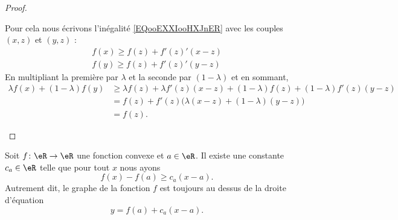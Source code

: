 \begin{proof}
\begin{subproof}
\begin{equation}
            \end{equation}
            Pour cela nous écrivons l'inégalité \eqref{EQooEXXIooHXJnER} avec les couples \( (x,z)\) et \( (y,z)\) :
            \begin{subequations}
                \begin{align}
                    f(x)\geq f(z)+f'(z)'(x-z)\\
                    f(y)\geq f(z)+f'(z)'(y-z)
                \end{align}
            \end{subequations}
            En multipliant la première par \( \lambda\) et la seconde par \( (1-\lambda)\) et en sommant,
            \begin{subequations}
                \begin{align}
                    \lambda f(x)+(1-\lambda)f(y)&\geq \lambda f(z)+\lambda f'(z)(x-z)+(1-\lambda)f(z)+(1-\lambda)f'(z)(y-z)\\
                    &=f(z)+f'(z)\big( \lambda(x-z)+(1-\lambda)(y-z) \big)\\
                    &=f(z).
                \end{align}
            \end{subequations}
    \end{subproof}
\end{proof}

\begin{proposition} \label{PropNIBooSbXIKO}
    Soit \( f\colon \eR\to \eR \) une fonction convexe et \( a\in \eR\). Il existe une constante \( c_a\in \eR\) telle que pour tout \( x\) nous ayons
    \begin{equation}    \label{EqSKIooSeAekM}
        f(x)-f(a)\geq c_a(x-a).
    \end{equation}
    Autrement dit, le graphe de la fonction \( f\) est toujours au dessus de la droite d'équation
    \begin{equation}
        y=f(a)+c_a(x-a).
    \end{equation}
\end{proposition}

